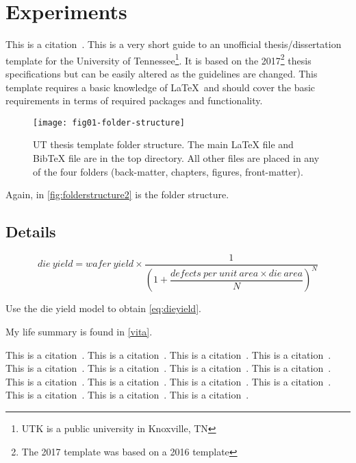 \chapter{Experiments} \label{chapter2}

This is a citation~\cite{utk:idr2016optimization}.
This is a very short guide to an unofficial thesis/dissertation template
for the University of Tennessee\footnote{UTK is a public university in Knoxville,
TN}.
It is based on the 2017\footnote{The 2017 template was based on a 2016 template} thesis specifications but can be easily altered
as the guidelines are changed.
This template requires a basic knowledge of \LaTeX\ and should cover
the basic requirements in terms of required packages and functionality.

\begin{figure}[!htb]
    \Centering
    \texttt{[image: fig01-folder-structure]}
    \caption[UT thesis template folder structure]{UT thesis template folder structure.
        The main LaTeX file and BibTeX file are in the top directory.
        All other files are placed in any of the four folders
        (back-matter, chapters, figures, front-matter).}
    \label{fig:folderstructure2}
\end{figure}

Again, in \autoref{fig:folderstructure2} is the folder structure.

\section{Details} \label{details}

\begin{equation}
    die\ yield = wafer\ yield \times \dfrac{1}{\left(1 + \dfrac{defects\ per\ unit\ area \times die\ area}{N}\right)^N}
    \label{eq:dieyield}
\end{equation}

Use the die yield model to obtain \autoref{eq:dieyield}.

My life summary is found in \autoref{vita}.

This is a citation~\cite{utk:rdf2018jac}.
This is a citation~\cite{utk:hspwrap2015blast}.
This is a citation~\cite{pupr:plasma2014fpga}.
This is a citation~\cite{ornl:sensorfusion2012}.
This is a citation~\cite{ornl:dmrg2011}.
This is a citation~\cite{caaqa2017appsol}.
This is a citation~\cite{caaqa2017}.
This is a citation~\cite{ornl:poplar2014gateway}.
This is a citation~\cite{utk:hspwrap2014blast}.
This is a citation~\cite{ornl:async2012gpu}.
This is a citation~\cite{ornl:async2011gpu}.
This is a citation~\cite{ornl:dmrg2010}.
This is a citation~\cite{ornl:ipcc2009}.
This is a citation~\cite{utk:idr2015cohpc}.
This is a citation~\cite{pupr:chair2010icste}.
